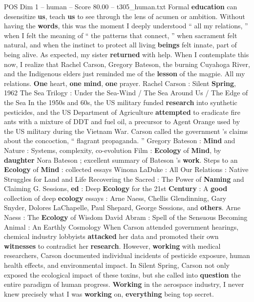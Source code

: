 \begin{textsample}{POS Dim 1 – human – Score 80.00 – t305\_human.txt}
Formal \textbf{education} can desensitize \textbf{us}, teach \textbf{us} to see through the lens of acumen or ambition.
Without having the \textbf{words}, this was the moment I deeply understood “ all my relations, ” when I felt the meaning of “ the patterns that connect, ” when sacrament felt natural, and when the instinct to protect all living \textbf{beings} felt innate, part of being alive.
As expected, my sister \textbf{returned} with help.
When I contemplate this now, I realize that Rachel Carson, Gregory Bateson, the burning Cuyahoga River, and the Indigenous elders just reminded me of the \textbf{lesson} of the magpie.
All my relations. \textbf{One} heart, \textbf{one} \textbf{mind}, \textbf{one} prayer.
Rachel Carson : Silent \textbf{Spring}, 1962 The Sea Trilogy : Under the Sea-Wind / The Sea Around Us / The Edge of the Sea In the 1950s and 60s, the US military funded \textbf{research} into synthetic pesticides, and the US Department of Agriculture \textbf{attempted} to eradicate fire ants with a mixture of DDT and fuel oil, a precursor to Agent Orange used by the US military during the Vietnam War.
Carson called the government ’s claims about the concoction, “ flagrant propaganda. ” Gregory Bateson : \textbf{Mind} and Nature : Systems, complexity, co-evolution Film : \textbf{Ecology} of \textbf{Mind}, by \textbf{daughter} Nora Bateson ; excellent summary of Bateson ’s \textbf{work}.
Steps to an \textbf{Ecology} of \textbf{Mind} : collected essays Winona LaDuke : All Our Relations : Native Struggles for Land and Life Recovering the Sacred : The Power of \textbf{Naming} and Claiming G.
Sessions, \textbf{ed} : Deep \textbf{Ecology} for the 21st \textbf{Century} : A \textbf{good} collection of deep \textbf{ecology} essays : Arne Naess, Chellis Glendinning, Gary Snyder, Dolores LaChapelle, Paul Shepard, George Sessions, and \textbf{others}.
Arne Naess : The \textbf{Ecology} of Wisdom David Abram : Spell of the Sensuous Becoming Animal : An Earthly Cosmology When Carson attended government hearings, chemical industry lobbyists \textbf{attacked} her data and promoted their own \textbf{witnesses} to contradict her \textbf{research}.
However, \textbf{working} with medical researchers, Carson documented individual incidents of pesticide exposure, human health effects, and environmental impact.
In Silent Spring, Carson not only exposed the ecological impact of these toxins, but she called into \textbf{question} the entire paradigm of human progress. \textbf{Working} in the aerospace industry, I never knew precisely what I was \textbf{working} on, \textbf{everything} being top secret.

\end{textsample}

